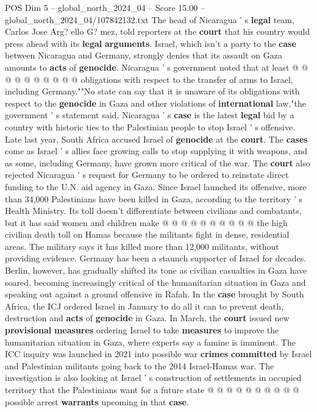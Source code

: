 \begin{textsample}{POS Dim 5 – global\_north\_2024\_04 – Score 15.00 – global\_north\_2024\_04/107842132.txt}
The head of Nicaragua ' s \textbf{legal} team, Carlos Jose Arg? ello G? mez, told reporters at the \textbf{court} that his country would press ahead with its \textbf{legal} \textbf{arguments}.
Israel, which isn't a party to the \textbf{case} between Nicaragua and Germany, strongly denies that its assault on Gaza amounts to \textbf{acts} of \textbf{genocide}.
Nicaragua ' s government noted that at least @ @ @ @ @ @ @ @ @ @ obligations with respect to the transfer of arms to Israel, including Germany.""No state can say that it is unaware of its obligations with respect to the \textbf{genocide} in Gaza and other violations of \textbf{international} law,"the government ' s statement said.
Nicaragua ' s \textbf{case} is the latest \textbf{legal} bid by a country with historic ties to the Palestinian people to stop Israel ' s offensive.
Late last year, South Africa accused Israel of \textbf{genocide} at the \textbf{court}.
The \textbf{cases} come as Israel ' s allies face growing calls to stop supplying it with weapons, and as some, including Germany, have grown more critical of the war.
The \textbf{court} also rejected Nicaragua ' s request for Germany to be ordered to reinstate direct funding to the U.N. aid agency in Gaza.
Since Israel launched its offensive, more than 34,000 Palestinians have been killed in Gaza, according to the territory ' s Health Ministry.
Its toll doesn't differentiate between civilians and combatants, but it has said women and children make @ @ @ @ @ @ @ @ @ @ the high civilian death toll on Hamas because the militants fight in dense, residential areas.
The military says it has killed more than 12,000 militants, without providing evidence.
Germany has been a staunch supporter of Israel for decades.
Berlin, however, has gradually shifted its tone as civilian casualties in Gaza have soared, becoming increasingly critical of the humanitarian situation in Gaza and speaking out against a ground offensive in Rafah.
In the \textbf{case} brought by South Africa, the ICJ ordered Israel in January to do all it can to prevent death, destruction and \textbf{acts} of \textbf{genocide} in Gaza.
In March, the \textbf{court} issued new \textbf{provisional} \textbf{measures} ordering Israel to take \textbf{measures} to improve the humanitarian situation in Gaza, where experts say a famine is imminent.
The ICC inquiry was launched in 2021 into possible war \textbf{crimes} \textbf{committed} by Israel and Palestinian militants going back to the 2014 Israel-Hamas war.
The investigation is also looking at Israel ' s construction of settlements in occupied territory that the Palestinians want for a future state @ @ @ @ @ @ @ @ @ @ possible arrest \textbf{warrants} upcoming in that \textbf{case}.

\end{textsample}
